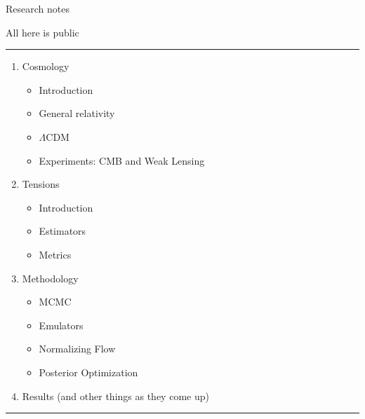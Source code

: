 \documentclass{book}
\theoremstyle{definition}
\theoremstyle{plain} %
\begin{document}
\begin{center}
	\huge{Research notes}
	
	\small{All here is public}
\end{center}

\medskip
\hrule

\begin{enumerate}
    \item Cosmology
    \begin{itemize}
	\item Introduction
	\item General relativity
	\item $\Lambda$CDM
	\item Experiments: CMB and Weak Lensing
    \end{itemize}
    \item Tensions
    \begin{itemize}
	\item Introduction
	\item Estimators
	\item Metrics
    \end{itemize}
    \item Methodology
    \begin{itemize}
	\item MCMC
	\item Emulators
	\item Normalizing Flow
	\item Posterior Optimization
    \end{itemize}
    \item Results (and other things as they come up)
\end{enumerate}

\medskip
\hrule

%





\newpage



%

%
\end{document}
